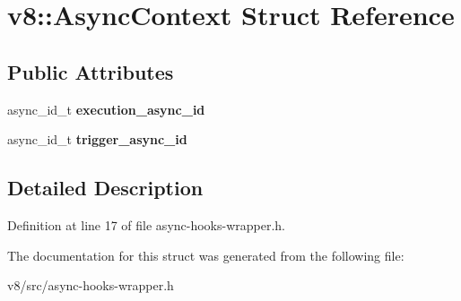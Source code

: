 \hypertarget{structv8_1_1AsyncContext}{}\section{v8\+:\+:Async\+Context Struct Reference}
\label{structv8_1_1AsyncContext}
\subsection*{Public Attributes}
\begin{DoxyCompactItemize}
\item 
\mbox{\label{structv8_1_1AsyncContext_a5f8ea3222d59cf0b2a04fce19d8443bc}} 
async\+\_\+id\+\_\+t {\bfseries execution\+\_\+async\+\_\+id}
\item 
\mbox{\label{structv8_1_1AsyncContext_aa7a2495abbf941073414821988ffd6f9}} 
async\+\_\+id\+\_\+t {\bfseries trigger\+\_\+async\+\_\+id}
\end{DoxyCompactItemize}


\subsection{Detailed Description}


Definition at line 17 of file async-\/hooks-\/wrapper.\+h.



The documentation for this struct was generated from the following file\+:\begin{DoxyCompactItemize}
\item 
v8/src/async-\/hooks-\/wrapper.\+h\end{DoxyCompactItemize}
